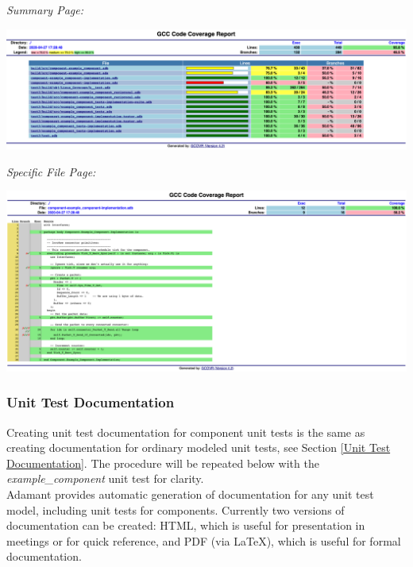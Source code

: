 \textit{Summary Page:}

\vspace{5mm} %
\includegraphics[width=\textwidth]{images/gcovr_component_1.png}
\vspace{5mm} %

\textit{Specific File Page:}

\vspace{5mm} %
\includegraphics[width=\textwidth]{images/gcovr_component_2.png}
\vspace{5mm} %

\subsubsection{Unit Test Documentation}

Creating unit test documentation for component unit tests is the same as creating documentation for ordinary modeled unit tests, see Section \ref{Unit Test Documentation}. The procedure will be repeated below with the \textit{example\_component} unit test for clarity. \\

Adamant provides automatic generation of documentation for any unit test model, including unit tests for components. Currently two versions of documentation can be created: HTML, which is useful for presentation in meetings or for quick reference, and PDF (via \LaTeX), which is useful for formal documentation. \\

